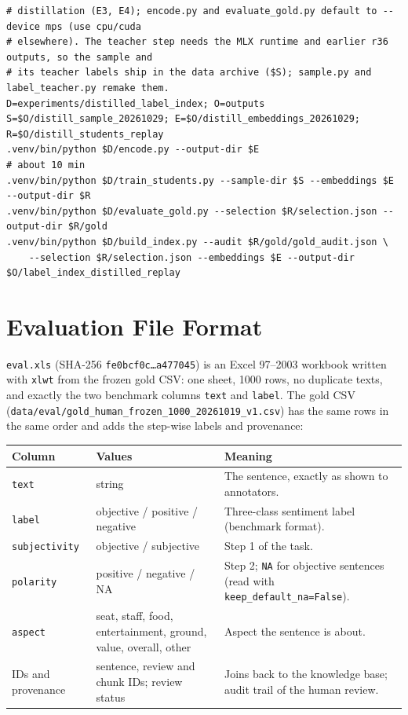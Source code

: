 \documentclass[10pt,twocolumn,a4paper]{article}
\begin{document}
\begin{Verbatim}[fontsize=\footnotesize, frame=single, framesep=3mm, rulecolor=\color{black!25}]
# distillation (E3, E4); encode.py and evaluate_gold.py default to --device mps (use cpu/cuda
# elsewhere). The teacher step needs the MLX runtime and earlier r36 outputs, so the sample and
# its teacher labels ship in the data archive ($S); sample.py and label_teacher.py remake them.
D=experiments/distilled_label_index; O=outputs
S=$O/distill_sample_20261029; E=$O/distill_embeddings_20261029; R=$O/distill_students_replay
.venv/bin/python $D/encode.py --output-dir $E                                   # about 10 min
.venv/bin/python $D/train_students.py --sample-dir $S --embeddings $E --output-dir $R
.venv/bin/python $D/evaluate_gold.py --selection $R/selection.json --output-dir $R/gold
.venv/bin/python $D/build_index.py --audit $R/gold/gold_audit.json \
    --selection $R/selection.json --embeddings $E --output-dir $O/label_index_distilled_replay
\end{Verbatim}

\section{Evaluation File Format}
\label{app:eval}

\texttt{eval.xls} (SHA-256 \texttt{fe0bcf0c…a477045}) is an Excel 97--2003 workbook written with \texttt{xlwt} from the
frozen gold CSV: one sheet, \num{1000} rows, no duplicate texts, and exactly the two benchmark columns \texttt{text} and
\texttt{label}. The gold CSV (\nolinkurl{data/eval/gold_human_frozen_1000_20261019_v1.csv}) has the same rows in the same
order and adds the step-wise labels and provenance:

\begin{center}\small
\begin{tabularx}{\textwidth}{@{}P{34mm}P{52mm}Y@{}}
\toprule
\textbf{Column} & \textbf{Values} & \textbf{Meaning} \\
\midrule
\texttt{text} & string & The sentence, exactly as shown to annotators. \\
\texttt{label} & objective / positive / negative & Three-class sentiment label (benchmark format). \\
\texttt{subjectivity} & objective / subjective & Step 1 of the task. \\
\texttt{polarity} & positive / negative / NA & Step 2; \texttt{NA} for objective sentences (read with \nolinkurl{keep_default_na=False}). \\
\texttt{aspect} & seat, staff, food, entertainment, ground, value, overall, other & Aspect the sentence is about. \\
IDs and provenance & sentence, review and chunk IDs; review status & Joins back to the knowledge base; audit trail of the human review. \\
\bottomrule
\end{tabularx}
\end{center}
\end{document}
